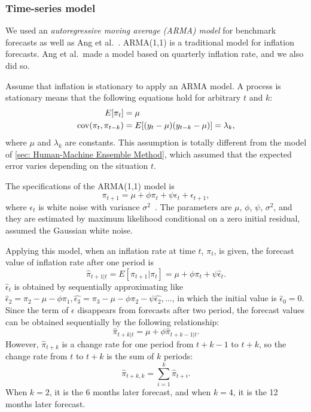 \documentclass[../main.tex]{subfiles}
\begin{document}
\subsubsection{Time-series model}
\label{ssub: Time-series model}

We used an \emph{autoregressive moving average (ARMA) model} for benchmark forecasts as well as Ang et al.~\cite{Ang2007}.
ARMA(1,1) is a traditional model for inflation forecasts.
Ang et al.\ made a model based on quarterly inflation rate, and we also did so.

Assume that inflation is stationary to apply an ARMA model.
A process is stationary means that the following equations hold for arbitrary $t$ and $k$:
\begin{align}
  \begin{split}
    E[\pi_t] &= \mu \\
    \operatorname{cov}(\pi_t, \pi_{t-k}) &= E[(y_t - \mu)(y_{t-k} - \mu)] = \lambda_k,
  \end{split}
\end{align}
where $\mu$ and $\lambda_k$ are constants.
This assumption is totally different from the model of \ref{sec: Human-Machine Ensemble Method}, which assumed that the expected error varies depending on the situation $t$.

The specifications of the ARMA(1,1) model is
\begin{equation}
  \pi_{t + 1} = \mu + \phi\pi_t + \psi\epsilon_t + \epsilon_{t + 1},
\end{equation}
where $\epsilon_t$ is white noise with variance $\sigma^2$~\cite{沖本2010}.
The parameters are $\mu$, $\phi$, $\psi$, $\sigma^2$, and they are estimated by maximum likelihood conditional on a zero initial residual, assumed the Gaussian white noise.

Applying this model, when an inflation rate at time $t$, $\pi_{t}$, is given, the forecast value of inflation rate after one period is
\begin{equation}
  \hat{\pi}_{t+1|t} = E[\pi_{t + 1}|\pi_t] = \mu + \phi\pi_t + \psi\hat{\epsilon}_t.
\end{equation}
$\hat{\epsilon}_t$ is obtained by sequentially approximating like $\hat{\epsilon}_2 = \pi_2 - \mu - \phi\pi_1, \hat{\epsilon_3} = \pi_3 - \mu - \phi\pi_2 - \psi\hat{\epsilon_2}, \dots$, in which the initial value is $\hat{\epsilon}_0 = 0$.
Since the term of $\epsilon$ disappears from forecasts after two period, the forecast values can be obtained sequentially by the following relationship:
\begin{equation*}
  \hat{\pi}_{t + k|t} = \mu + \phi\hat{\pi}_{t + k - 1|t}.
\end{equation*}
However, $\hat{\pi}_{t + k}$ is a change rate for one period from $t+k-1$ to $t+k$, so the change rate from $t$ to $t+k$ is the sum of $k$ periods:
\begin{equation}
  \hat{\pi}_{t + k, k} = \sum_{i=1}^k \hat{\pi}_{t+i}.
\end{equation}
When $k = 2$, it is the 6 months later forecast, and when $k = 4$, it is the 12 months later forecast.
\end{document}
